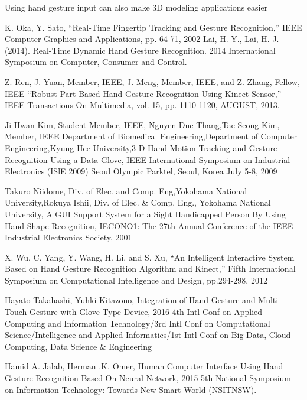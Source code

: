 \documentclass[11pt]{report}
\begin{document}
Using hand gesture input can also make 3D modeling applications easier

\begin{thebibliography}{999}

     K. Oka, Y. Sato, “Real-Time Fingertip Tracking and Gesture Recognition,” IEEE Computer Graphics and Applications, pp. 64-71, 2002
     Lai, H. Y., Lai, H. J. (2014). Real-Time Dynamic Hand Gesture Recognition. 2014 International Symposium on Computer, Consumer and Control. 
    
     Z. Ren, J. Yuan, Member, IEEE, J. Meng, Member, IEEE, and Z. Zhang, Fellow, IEEE “Robust Part-Based Hand Gesture Recognition Using Kinect Sensor,” IEEE Transactions On Multimedia, vol. 15, pp. 1110-1120, AUGUST, 2013.
    
     Ji-Hwan Kim, Student Member, IEEE, Nguyen Duc Thang,Tae-Seong Kim, Member, IEEE Department of Biomedical Engineering,Department of Computer Engineering,Kyung Hee University,3-D Hand Motion Tracking and Gesture Recognition
    Using a Data Glove, IEEE International Symposium on Industrial Electronics (ISlE 2009) Seoul Olympic Parktel, Seoul, Korea July 5-8, 2009
    
     Takuro Niidome, Div. of Elec. and Comp. Eng,Yokohama National University,Rokuya Ishii, Div. of Elec. \& Comp. Eng., Yokohama National University, A GUI Support System for a Sight Handicapped Person By Using Hand Shape Recognition, IECONO1: The 27th Annual Conference of the IEEE Industrial Electronics Society, 2001
    
     X. Wu, C. Yang, Y. Wang, H. Li, and S. Xu, “An Intelligent Interactive System Based on Hand Gesture Recognition Algorithm and Kinect,” Fifth International Symposium on Computational Intelligence and Design, pp.294-298, 2012
    
     Hayato Takahashi, Yuhki Kitazono, Integration of Hand Gesture and Multi Touch Gesture with Glove Type Device, 2016 4th Intl Conf on Applied Computing and Information Technology/3rd Intl Conf on Computational Science/Intelligence and Applied Informatics/1st Intl Conf on Big Data, Cloud Computing, Data Science \& Engineering
    
     Hamid A. Jalab, Herman .K. Omer, Human Computer Interface Using Hand Gesture Recognition Based On Neural Network, 2015 5th National Symposium on Information Technology: Towards New Smart World (NSITNSW).
    

\end{thebibliography}
\end{document}
